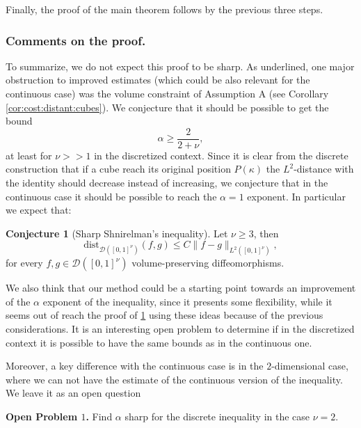 \documentclass[12 pt]{article}
\theoremstyle{definition} \newtheorem{definition}{Definition}[section]
\theoremstyle{definition} \newtheorem{remark}[definition]{Remark}
\theoremstyle{plain} \newtheorem{lemma}[definition]{Lemma}
\theoremstyle{plain} \newtheorem{proposition}[definition]{Proposition}
\theoremstyle{plain} \newtheorem{theorem}[definition]{Theorem}
\theoremstyle{plain} \newtheorem{corollary}[definition]{Corollary}
\theoremstyle{definition} \newtheorem{example}[definition]{Example}
\theoremstyle{definition} \newtheorem{assumption}[definition]{Assumption}
\theoremstyle{definition} \newtheorem{conjecture}[definition]{Conjecture}
\newcommand{\1}{\mathbbm 1}
\numberwithin{equation}{section}
\begin{document}
Finally, the proof of the main theorem follows by the previous three steps. 
         
        
         \subsubsection{Comments on the proof.}
         To summarize, we do not expect this proof to be sharp. As underlined, one major obstruction to improved estimates (which could be also relevant for the continuous case) was the volume constraint of Assumption A (see Corollary \ref{cor:cost:distant:cubes}). We conjecture that it should be possible to get the bound 
         \begin{equation*}
             \alpha\geq\frac{2}{2+\nu},
         \end{equation*}
       at least for $\nu>>1$ in the discretized context. Since it is clear from the discrete construction that if a cube reach its original position $P(\kappa)$ the $L^2$-distance with the identity should decrease instead of increasing, we conjecture that in the continuous case it should be possible to reach the $\alpha=1$ exponent. In particular we expect that:
\begin{conjecture}[Sharp Shnirelman's inequality]\label{conj:sharp:shnirelman}
     Let $\nu\geq 3$, then
    \begin{equation*}
        \text{dist}_{\mathcal{D}([0,1]^\nu)}(f,g)\leq C\|f-g\|_{L^2([0,1]^\nu)},
    \end{equation*}
    for every $f,g\in\mathcal{D}([0,1]^\nu)$ volume-preserving diffeomorphisms. 
\end{conjecture}

We also think that our method could be a starting point towards an improvement of the $\alpha$ exponent of the inequality, since it presents some flexibility, while it seems out of reach the proof of \ref{conj:sharp:shnirelman} using these ideas because of the previous considerations. It is an interesting open problem to determine if in the discretized context it is possible to have the same bounds as in the continuous one.
 
\medskip

Moreover, a key difference with the continuous case is in the $2$-dimensional case, where we can not have the estimate of the continuous version of the inequality. We leave it as an open question

\medskip
\textbf{Open Problem $1$.} Find $\alpha$ sharp for the discrete inequality in the case $\nu=2$. 
\end{document}

